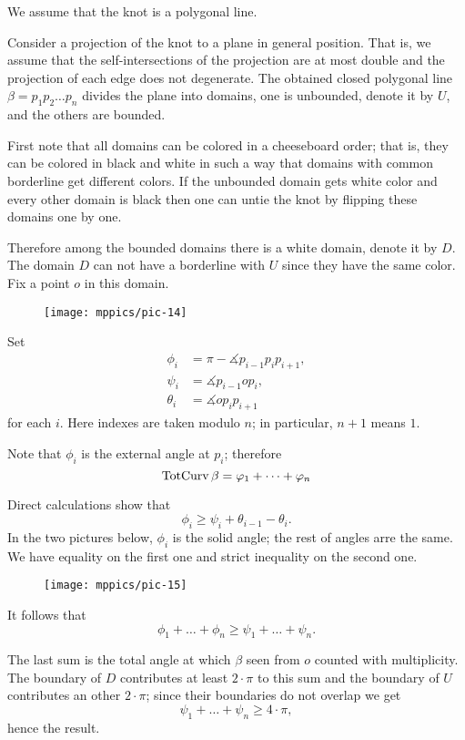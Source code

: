 We assume that the knot is a polygonal line.

Consider a projection of the knot to a plane in general position.
That is, we assume that the self-intersections of the projection are at most double and the projection of each edge does not degenerate.
The obtained closed polygonal line $\beta=p_1p_2\dots p_n$ divides the plane into domains, one is unbounded, denote it by $U$, and the others are bounded.

First note that all domains can be colored in a cheeseboard order;
that is, they can be colored in black and white in such a way that domains with common borderline get different colors.
If the unbounded domain gets white color and every other domain is black then one can untie the knot by flipping these domains one by one.

Therefore among the bounded domains there is a white domain, denote it by $D$.
The domain $D$ can not have a borderline with $U$ since they have the same color.
Fix a point $o$ in this domain.

\begin{wrapfigure}{r}{30 mm}
\vskip-0mm
\centering
\texttt{[image: mppics/pic-14]}
\vskip0mm
\end{wrapfigure}

Set 
\begin{align*}
\phi_i&=\pi-\measuredangle p_{i-1}p_ip_{i+1},
\\
\psi_i&=\measuredangle p_{i-1} o p_{i},
\\
\theta_i&=\measuredangle o p_i p_{i+1}
\end{align*}
for each $i$.
Here indexes are taken modulo $n$; in particular, $n+1$ means $1$.


Note that $\phi_i$ is the external angle at $p_i$;
therefore 
\[\mathop{\rm TotCurv}\nolimits\beta= \varphi_1+\dots+\varphi_n\]

Direct calculations show that 
\[\phi_i\ge \psi_i+\theta_{i-1}-\theta_i.\]
In the two pictures below, $\phi_i$ is the solid angle;
the rest of angles arre the same.
We have equality on the first one and strict inequality on the second one.

\begin{figure}[h]
\vskip-0mm
\centering
\texttt{[image: mppics/pic-15]}
\vskip0mm
\end{figure}

It follows that 
\[\phi_1+\dots+\phi_n\ge \psi_1+\dots+\psi_n.\]

The last sum 
is the total angle at  which $\beta$ seen from $o$ counted with multiplicity. 
The boundary of $D$ contributes at least $2\cdot\pi$ to this sum and the boundary of $U$ contributes an other $2\cdot\pi$;
since their boundaries do not overlap we get 
\[\psi_1+\dots+\psi_n\ge 4\cdot\pi,\]
hence the result.

